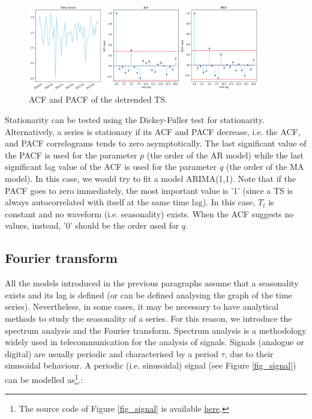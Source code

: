 \begin{figure}[hbt!]
\centering
\includegraphics[width=0.9\textwidth]{SectionLetsMath/elemStat_figures/fig_StationaryTS.png}
\captionsetup{type=figure}
\caption{ACF and PACF of the detrended TS.}
\label{fig_StationaryTS}
\end{figure}

Stationarity can be tested using the Dickey-Fuller test for stationarity. Alternatively, a series is stationary if its ACF and PACF decrease, i.e. the ACF, and PACF correlograms tends to zero asymptotically. The last significant value of the PACF is used for the parameter $p$ (the order of the AR model) while the last significant lag value of the ACF is used for the parameter $q$ (the order of the MA model). In this case, we would try to fit a model ARIMA(1,1). Note that if the PACF goes to zero immediately, the most important value is '1' (since a TS is always autocorrelated with itself at the same time lag). In this case, $T_t$ is constant and no waveform (i.e. seasonality) exists. When the ACF suggests no values, instead, '0' should be the order used for $q$.

\subsection{Fourier transform} \label{secFourier}

All the models introduced in the previous paragraphs assume that a seasonality exists and its lag is defined (or can be defined analysing the graph of the time series). Nevertheless, in some cases, it may be necessary to have analytical methods to study the seasonality of a series. For this reason, we introduce the spectrum analysis and the Fourier transform. Spectrum analysis is a methodology widely used in telecommunication for the analysis of signals. Signals (analogue or digital) are usually periodic and characterised by a period $\tau$, due to their sinusoidal behaviour. A periodic (i.e. sinusoidal) signal (see Figure \ref{fig_signal}) can be modelled as\footnote{The source code of Figure \ref{fig_signal} is available \href{https://github.com/aletuf93/logproj/blob/master/examples/03.\%20Statistics.ipynb}{here}.}.:

